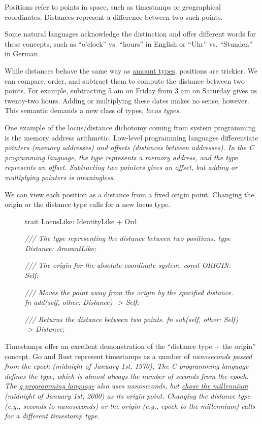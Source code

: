 \documentclass{article}
\begin{document}
Positions refer to points in space, such as timestamps or geographical coordinates.
Distances represent a difference between two such points.

Some natural languages acknowledge the distinction and offer different words for these concepts, such as ``o'clock'' vs. ``hours'' in English or ``Uhr'' vs. ``Stunden'' in German.

While distances behave the same way as \href{#amount-types}{amount types}, positions are trickier.
We can compare, order, and subtract them to compute the distance between two points.
For example, subtracting 5 am on Friday from 3 am on Saturday gives us twenty-two hours.
Adding or multiplying these dates makes no sense, however.
This semantic demands a new class of types, \em{locus types}.

One example of the locus/distance dichotomy coming from system programming is the memory address arithmetic.
Low-level programming languages differentiate \em{pointers} (memory addresses) and \em{offsets} (distances between addresses).
In the C programming language, the  type represents a memory address, and the  type represents an offset.
Subtracting two pointers gives an offset, but adding or multiplying pointers is meaningless.

We can view each position as a distance from a fixed origin point.
Changing the origin or the distance type calls for a new locus type.

\begin{figure}
\begin{code}
trait LocusLike: IdentityLike + Ord {
  \em{/// The type representing the distance between two positions.}
  type Distance: AmountLike;

  \em{/// The origin for the absolute coordinate system.}
  const ORIGIN: Self;

  \em{/// Moves the point away from the origin by the specified distance.}
  fn add(self, other: Distance) -> Self;

  \em{/// Returns the distance between two points.}
  fn sub(self, other: Self) -> Distance;
}
\end{code}
\end{figure}

Timestamps offer an excellent demonstration of the ``distance type + the origin'' concept.
Go and Rust represent timestamps as a number of \em{nanoseconds} passed from the  epoch (midnight of January 1st, 1970),
The C programming language defines the \href{https://en.cppreference.com/w/c/chrono/time_t}{} type, which is almost always the number of \em{seconds} from the  epoch.
The \href{https://en.wikipedia.org/wiki/Q_(programming_language_from_Kx_Systems)}{q programming language} also uses nanoseconds, but \href{https://code.kx.com/q4m3/2_Basic_Data_Types_Atoms/#253-date-time-types}{chose the \em{millennium}} (midnight of January 1st, 2000) as its origin point.
Changing the distance type (e.g., seconds to nanoseconds) or the origin (e.g.,  epoch to the millennium) calls for a different timestamp type.
\end{document}
